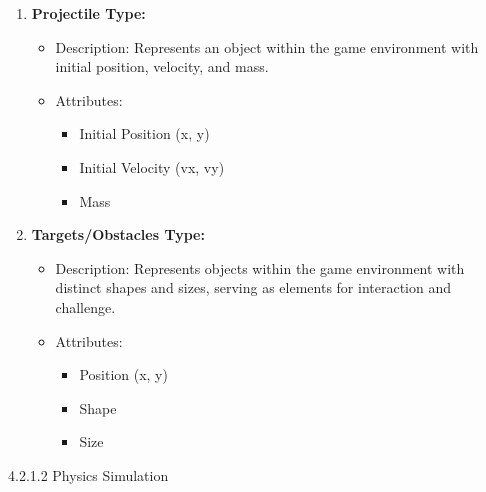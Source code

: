 \documentclass[
]{article}
\begin{document}
\begin{enumerate}
\def\labelenumi{\arabic{enumi}.}
\item
  \textbf{Projectile Type:}

  \begin{itemize}
  \item
    Description: Represents an object within the game environment with
    initial position, velocity, and mass.
  \item
    Attributes:

    \begin{itemize}
    \item
      Initial Position (x, y)
    \item
      Initial Velocity (vx, vy)
    \item
      Mass
    \end{itemize}
  \end{itemize}
\item
  \textbf{Targets/Obstacles Type:}

  \begin{itemize}
  \item
    Description: Represents objects within the game environment with
    distinct shapes and sizes, serving as elements for interaction and
    challenge.
  \item
    Attributes:

    \begin{itemize}
    \item
      Position (x, y)
    \item
      Shape
    \item
      Size
    \end{itemize}
  \end{itemize}
\end{enumerate}

4.2.1.2 Physics Simulation
\end{document}
